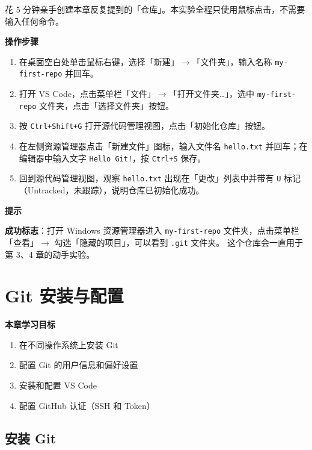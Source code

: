 \documentclass[12pt,a4paper,openany]{ctexbook}
\newenvironment{tipbox}{%
  \medskip
  \noindent\textbf{\faLightbulb\; 提示}
  \smallskip
}{%
  \medskip
}
\newenvironment{stepbox}{%
  \medskip
  \noindent\textbf{\faCogs\; 操作步骤}
  \smallskip
}{%
  \medskip
}
\begin{document}
花 5 分钟亲手创建本章反复提到的「仓库」。本实验全程只使用鼠标点击，不需要输入任何命令。

\begin{stepbox}
\begin{enumerate}[leftmargin=1.5em]
  \item 在桌面空白处单击鼠标右键，选择「新建」$\to$「文件夹」，输入名称 \texttt{my-first-repo} 并回车。
  \item 打开 VS Code，点击菜单栏「文件」$\to$「打开文件夹…」，选中 \texttt{my-first-repo} 文件夹，点击「选择文件夹」按钮。
  \item 按 \texttt{Ctrl+Shift+G} 打开源代码管理视图，点击「初始化仓库」按钮。
  \item 在左侧资源管理器点击「新建文件」图标，输入文件名 \texttt{hello.txt} 并回车；在编辑器中输入文字 \texttt{Hello Git!}，按 \texttt{Ctrl+S} 保存。
  \item 回到源代码管理视图，观察 \texttt{hello.txt} 出现在「更改」列表中并带有 \texttt{U} 标记（Untracked，未跟踪），说明仓库已初始化成功。
\end{enumerate}
\end{stepbox}

\begin{tipbox}
\textbf{成功标志}：打开 Windows 资源管理器进入 \texttt{my-first-repo} 文件夹，点击菜单栏「查看」$\to$ 勾选「隐藏的项目」，可以看到 \texttt{.git} 文件夹。
这个仓库会一直用于第 3、4 章的动手实验。
\end{tipbox}

\chapter{Git 安装与配置}

\begin{infobox}
\textbf{本章学习目标}
\begin{enumerate}[leftmargin=1.5em]
  \item 在不同操作系统上安装 Git
  \item 配置 Git 的用户信息和偏好设置
  \item 安装和配置 VS Code
  \item 配置 GitHub 认证（SSH 和 Token）
\end{enumerate}
\end{infobox}

\section{安装 Git}
\end{document}

